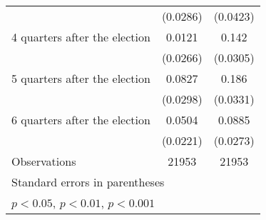 \begin{table}[htbp]
\begin{tabular}{l*{2}{c}}
                    &    (0.0286)         &    (0.0423)         \\
[1em]
 4 quarters after the election&      0.0121         &       0.142\sym{***}\\
                    &    (0.0266)         &    (0.0305)         \\
[1em]
 5 quarters after the election&      0.0827\sym{**} &       0.186\sym{***}\\
                    &    (0.0298)         &    (0.0331)         \\
[1em]
 6 quarters after the election&      0.0504\sym{*}  &      0.0885\sym{**} \\
                    &    (0.0221)         &    (0.0273)         \\
\hline
Observations        &       21953         &       21953         \\
\hline\hline
\multicolumn{3}{l}{\footnotesize Standard errors in parentheses}\\
\multicolumn{3}{l}{\footnotesize \sym{*} \(p<0.05\), \sym{**} \(p<0.01\), \sym{***} \(p<0.001\)}\\
\end{tabular}
\end{table}

